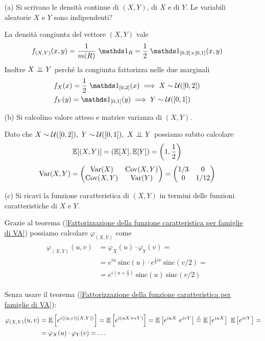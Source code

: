\Soluzione{} %
\begin{itemize}
\item [(a)] Si scrivano le densità continue di $(X,Y)$, di $X$ e di $Y$. Le variabili aleatorie $X$ e $Y$ sono indipendenti?

La densità congiunta del vettore $(X,Y)$ vale
\[
\fXYxy=\frac{1}{m(R)}\ \Ind_R=\frac{1}{2}\ \Ind_{[0,2]\times [0,1]}(x,y)
\]
Inoltre $X\perp \!\!\! \perp Y$ perché la congiunta fattorizza nelle due marginali
\begin{gather*}
\begin{aligned}
&f_X(x)=\frac{1}{2}\ \Ind_{[0,2]}(x)\implies X\sim\Uc([0,2])\\
&f_Y(y)=\Ind_{[0,1]}(y)\implies Y\sim\Uc([0,1])
\end{aligned}
\end{gather*}

\item [(b)] Si calcolino valore atteso e matrice varianza di $(X,Y)$.

Dato che $X\sim\Uc([0,2]),\ Y\sim\Uc([0,1]),\ X\indep Y$ possiamo subito calcolare
\[
\mathbb{E}[(X,Y)]=\left(\mathbb{E}[X],\mathbb{E}[Y]\right)=\left(1,\frac{1}{2}\right)
\]
\[
\operatorname{Var}(X,Y)=\begin{pmatrix}
\operatorname{Var}(X) & \operatorname{Cov}(X,Y) \\
\operatorname{Cov}(X,Y) & \operatorname{Var}(Y) \\
\end{pmatrix}=\begin{pmatrix}
1/3 & 0 \\
0 & 1/12 \\
\end{pmatrix}
\]

\item [(c)] Si ricavi la funzione caratteristica di $(X,Y)$ in termini delle funzioni caratteristiche di $X$ e $Y$.

Grazie al teorema (\ref{Fattorizzazione della funzione caratteristica per famiglie di VA}) possiamo calcolare $\varphi_{(X,Y)}$ come
\begin{gather*}
\begin{aligned}
\varphi_{(X,Y)}(u,v)&=\varphi_X(u)\cdot \varphi_Y(v)=\\
&=e^{iu}\ \text{sinc}(u)\cdot e^{\frac{1}{2}iv}\ \text{sinc}\left(v/2\right)=\\
&=e^{i\left(u+\frac{v}{2}  \right)}\ \text{sinc}(u)\ \text{sinc}\left(v/2\right)
\end{aligned}
\end{gather*}

\begin{oss}
Senza usare il teorema (\ref{Fattorizzazione della funzione caratteristica per famiglie di VA}):
\begin{gather*}
\begin{aligned}
\varphi_{(X,Y)}(u,v)&=\EE\left[e^{i\langle(u,v)|(X,Y)  \rangle}   \right]=\EE\left[e^{i(uX+vY)}   \right]=\EE\left[e^{iuX}\ e^{ivY}   \right]\overset{\underset{\indep}{}}{=}\EE\left[e^{iuX}\right]\ \EE\left[e^{ivY}\right]=\\
&=\varphi_X(u)\cdot \varphi_Y(v)=\dots
\end{aligned}
\end{gather*}
\end{oss}


\end{itemize}
